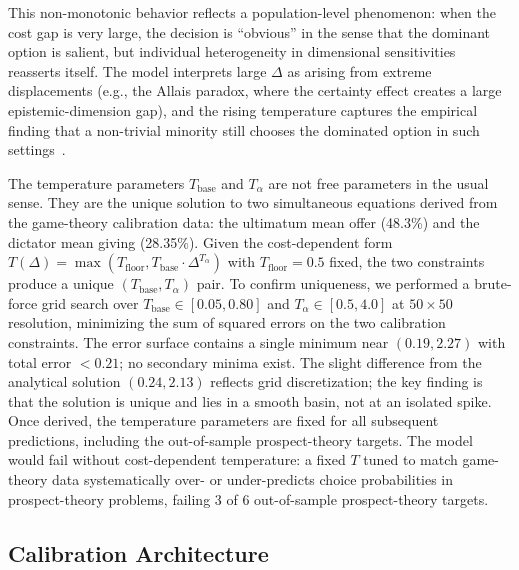 \documentclass[journal]{IEEEtran}
\begin{document}
This non-monotonic behavior reflects a population-level phenomenon: when the cost gap is very large, the decision is ``obvious'' in the sense that the dominant option is salient, but individual heterogeneity in dimensional sensitivities reasserts itself.
The model interprets large $\Delta$ as arising from extreme displacements (e.g., the Allais paradox, where the certainty effect creates a large epistemic-dimension gap), and the rising temperature captures the empirical finding that a non-trivial minority still chooses the dominated option in such settings~\cite{kahneman1979}.

The temperature parameters $T_{\text{base}}$ and $T_\alpha$ are not free parameters in the usual sense.
They are the unique solution to two simultaneous equations derived from the game-theory calibration data: the ultimatum mean offer (48.3\%) and the dictator mean giving (28.35\%).
Given the cost-dependent form $T(\Delta) = \max(T_{\text{floor}}, T_{\text{base}} \cdot \Delta^{T_\alpha})$ with $T_{\text{floor}} = 0.5$ fixed, the two constraints produce a unique $(T_{\text{base}}, T_\alpha)$ pair.
To confirm uniqueness, we performed a brute-force grid search over $T_{\text{base}} \in [0.05, 0.80]$ and $T_\alpha \in [0.5, 4.0]$ at $50 \times 50$ resolution, minimizing the sum of squared errors on the two calibration constraints.
The error surface contains a single minimum near $(0.19, 2.27)$ with total error $< 0.21$; no secondary minima exist.
The slight difference from the analytical solution $(0.24, 2.13)$ reflects grid discretization; the key finding is that the solution is unique and lies in a smooth basin, not at an isolated spike.
Once derived, the temperature parameters are fixed for all subsequent predictions, including the out-of-sample prospect-theory targets.
The model would fail without cost-dependent temperature: a fixed $T$ tuned to match game-theory data systematically over- or under-predicts choice probabilities in prospect-theory problems, failing 3 of 6 out-of-sample prospect-theory targets.

\subsection{Calibration Architecture}
\end{document}

